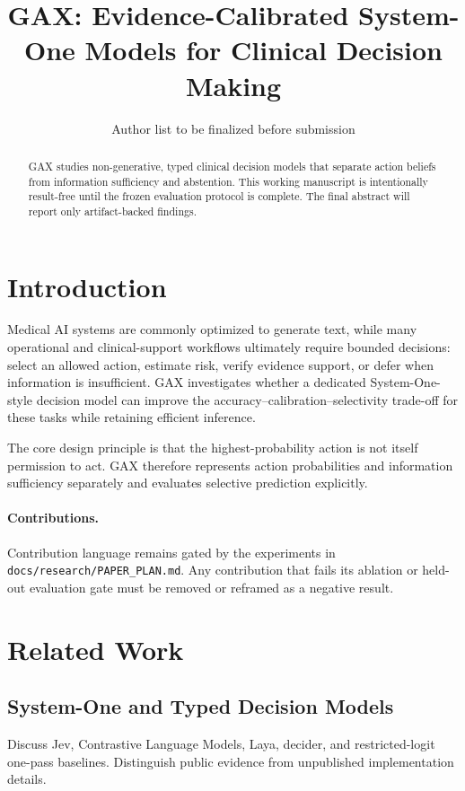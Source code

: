 \documentclass[11pt]{article}
\title{GAX: Evidence-Calibrated System-One Models for Clinical Decision Making}
\author{Author list to be finalized before submission}
\date{}
\begin{document}
\maketitle


\begin{abstract}
GAX studies non-generative, typed clinical decision models that separate action
beliefs from information sufficiency and abstention. This working manuscript is
intentionally result-free until the frozen evaluation protocol is complete.
The final abstract will report only artifact-backed findings.
\end{abstract}

\section{Introduction}

Medical AI systems are commonly optimized to generate text, while many
operational and clinical-support workflows ultimately require bounded decisions:
select an allowed action, estimate risk, verify evidence support, or defer when
information is insufficient. GAX investigates whether a dedicated
System-One-style decision model can improve the accuracy--calibration--selectivity
trade-off for these tasks while retaining efficient inference.

The core design principle is that the highest-probability action is not itself
permission to act. GAX therefore represents action probabilities and information
sufficiency separately and evaluates selective prediction explicitly.

\paragraph{Contributions.}
Contribution language remains gated by the experiments in
\texttt{docs/research/PAPER\_PLAN.md}. Any contribution that fails its ablation
or held-out evaluation gate must be removed or reframed as a negative result.

\section{Related Work}

\subsection{System-One and Typed Decision Models}
Discuss Jev, Contrastive Language Models, Laya, decider, and restricted-logit
one-pass baselines. Distinguish public evidence from unpublished implementation
details.
\end{document}
